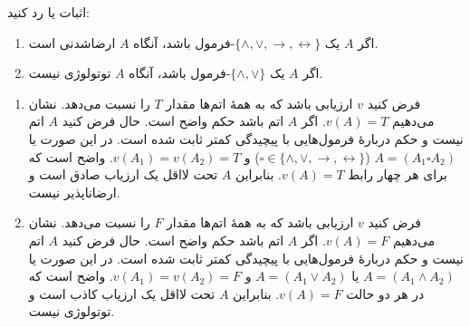 اثبات یا رد کنید:

\begin{enumerate}
\item
اگر $A$ یک $\{\wedge,\vee,\rightarrow,\leftrightarrow\}$-فرمول باشد، آنگاه $A$ ارضاشدنی است.
\item
اگر $A$ یک $\{\wedge,\vee\}$-فرمول باشد، آنگاه $A$ توتولوژی نیست.
\end{enumerate}\quad\vspace{-9mm}
\begin{ans}
\begin{enumerate}
  \item
  فرض کنید $v$ ارزیابی باشد که به همهٔ اتم‌ها مقدار $T$ را نسبت می‌دهد. نشان می‌دهیم $v(A)=T$. اگر $A$ اتم باشد حکم واضح است. حال فرض کنید $A$ اتم نیست و حکم دربارهٔ فرمول‌هایی با پیچیدگی کمتر ثابت شده است. در این صورت یا $A=(A_1\square A_2)$ ($\square\in\{\wedge,\vee,\rightarrow,\leftrightarrow\}$) و $v(A_1)=v(A_2)=T$. واضح است که برای هر چهار رابط $v(A)=T$. بنابراین $A$ تحت لااقل یک ارزیاب صادق است و ارضاناپذیر نیست.
  
  \item
  فرض کنید $v$ ارزیابی باشد که به همهٔ اتم‌ها مقدار $F$ را نسبت می‌دهد. نشان می‌دهیم $v(A)=F$. اگر $A$ اتم باشد حکم واضح است. حال فرض کنید $A$ اتم نیست و حکم دربارهٔ فرمول‌هایی با پیچیدگی کمتر ثابت شده است. در این صورت یا $A=(A_1\wedge A_2)$ یا $A=(A_1\vee A_2)$ و $v(A_1)=v(A_2)=F$. واضح است که در هر دو حالت $v(A)=F$. بنابراین $A$ تحت لااقل یک ارزیاب کاذب است و توتولوژی نیست.
  
  \end{enumerate}
\end{ans}

